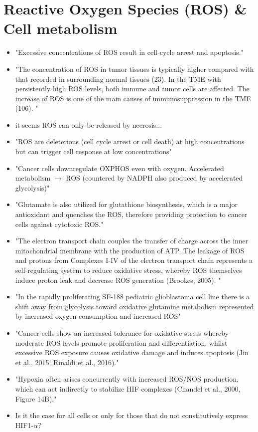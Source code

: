 \documentclass[11pt,a4paper]{article}
\begin{document}
\section{Reactive Oxygen Species (ROS) \& Cell metabolism}
\begin{itemize}
\item "Excessive concentrations of ROS result in cell‐cycle arrest and apoptosis." \cite{Nakamura2021}
\item "The concentration of ROS in tumor tissues is typically higher compared with that recorded in surrounding normal tissues (23). In the TME with persistently high ROS levels, both immune and tumor cells are affected. The increase of ROS is one of the main causes of immunosuppression in the TME (106). "\cite{Liang2021}
\item it seems ROS can only be released by necrosis...
\item "ROS are deleterious (cell cycle arrest or cell death) at high concentrations but can trigger cell response at low concentrations" \cite{Arfin2021}
\item "Cancer cells downregulate OXPHOS even with oxygen. Accelerated metabolism $\rightarrow$ ROS (countered by NADPH also produced by accelerated glycolysis)"\cite{Arfin2021}
\item "Glutamate is also utilized for glutathione biosynthesis, which is a major antioxidant and quenches the ROS, therefore providing protection to cancer cells against cytotoxic ROS."\cite{Mudassar2020}
\item "The electron transport chain couples the transfer of charge across the inner mitochondrial membrane with the production of ATP. The leakage of ROS and protons from Complexes I-IV of the electron transport chain represents a self-regulating system to reduce oxidative stress, whereby ROS themselves induce proton leak and decrease ROS generation (Brookes, 2005). "\cite{Strickland2017}
\item "In the rapidly proliferating SF-188 pediatric glioblastoma cell line there is a shift away from glycolysis toward oxidative glutamine metabolism represented by increased oxygen consumption and increased ROS"\cite{Strickland2017}
\item "Cancer cells show an increased tolerance for oxidative stress whereby moderate ROS levels promote proliferation and differentiation, whilst excessive ROS exposure causes oxidative damage and induces apoptosis (Jin et al., 2015; Rinaldi et al., 2016)."\cite{Strickland2017} 
\item "Hypoxia often arises concurrently with increased ROS/NOS production, which can act indirectly to stabilize HIF complexes (Chandel et al., 2000, Figure 14B)."\cite{Strickland2017} 
\item Is it the case for all cells or only for those that do not constitutively express HIF1-$\alpha ?$
\end{itemize}
\end{document}
